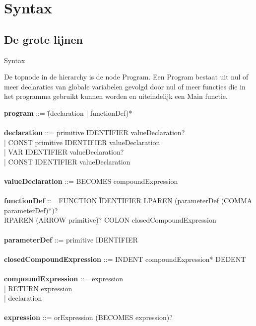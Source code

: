 \chapter{Syntax}
\section{De grote lijnen}
Syntax

De topnode in de hierarchy is de node Program. Een Program bestaat uit nul of meer declaraties van globale variabelen gevolgd door nul of meer functies die in het programma gebruikt kunnen worden en uiteindelijk een Main functie.

\begin{tabbing}

{\bf program}                     ::= \=(declaration | functionDef)*\\
\\
{\bf declaration}                 ::= \=primitive IDENTIFIER valueDeclaration?\\
                                      \> | CONST primitive IDENTIFIER valueDeclaration\\
                                      \> | VAR IDENTIFIER valueDeclaration?\\
                                      \> | CONST IDENTIFIER valueDeclaration\\
\\
{\bf valueDeclaration}            ::= BECOMES compoundExpression\\
\\
{\bf functionDef}                 ::= FUNCTION \=IDENTIFIER LPAREN (parameterDef (COMMA parameterDef)*)?\\
                                      \>RPAREN (ARROW primitive)? COLON closedCompoundExpression\\
\\
{\bf parameterDef}                ::= primitive IDENTIFIER \\
\\
{\bf closedCompoundExpression}    ::= INDENT compoundExpression* DEDENT\\
\\ 
{\bf compoundExpression}          ::= \=expression\\
                                      \> | RETURN expression\\
                                      \> | declaration\\
\\ 
{\bf expression}                  ::= orExpression (BECOMES expression)?\\

\end{tabbing}
